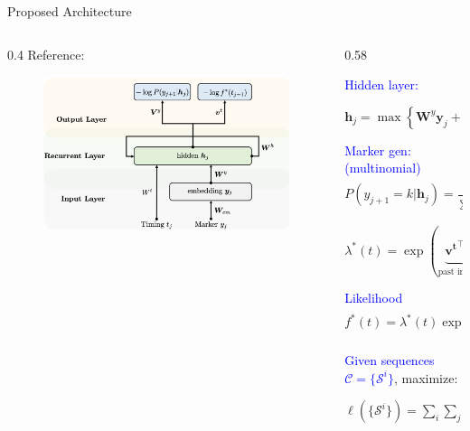 \documentclass{beamer}
\begin{document}
\begin{frame}{Proposed Architecture}
    \begin{columns}
        \begin{column}{0.4\textwidth}
            Reference: \cite{Nan2016}
            \begin{figure}
                \centering
                \includegraphics[width=0.97\linewidth]{slides_20231201//figures/recurrent_tpp_nan.png}
                \label{fig:rmtpp}
        \end{figure}
    \end{column}

    \begin{column}{0.58\textwidth}
            
            \textcolor{blue}{Hidden layer:} 
            
            $\boldsymbol{h}_j=\max\left\{\boldsymbol{W}^y\boldsymbol{y}_j+\boldsymbol{W}^t\boldsymbol{t}_j+\boldsymbol{W}^h\boldsymbol{h}_{j-1}+\boldsymbol{b}_h,0\right\}$

            \textcolor{blue}{Marker gen: (multinomial)}
            $P(y_{j+1}=k|\boldsymbol{h}_j)=\frac{\exp\left(\boldsymbol{V}_{k,\cdot}^y\boldsymbol{h}_j+b_k^y\right)}{\sum_{k=1}^K\exp\left(\boldsymbol{V}_{k,\cdot}^y\boldsymbol{h}_j+b_k^y\right)}$

            $\lambda^*(t)=\exp(\underbrace{\boldsymbol{v^t}^\top\cdot\boldsymbol{h_j}}_{\text{past influence}}+\underbrace{w^t(t-t_j)}_{\text{current influence}}+\underbrace{b^t}_{\text{base intensity}})$

            \textcolor{blue}{Likelihood}
            $f^*(t)=\lambda^*(t)\exp\left(-\int_{t_j}^t\lambda^*(\tau)d\tau\right)$

            \textcolor{blue}{Given sequences $\mathcal{C}=\{\mathcal{S}^i\}$}, maximize:

            $\ell(\{\mathcal{S}^i\})=\sum_i\sum_j\left(\log P(y_{j+1}^i|\boldsymbol{h}_j)+\log f(t_{j+1}^i|\boldsymbol{h}_j)\right)$
            
    \end{column}
    \end{columns}
\end{frame}
\end{document}
